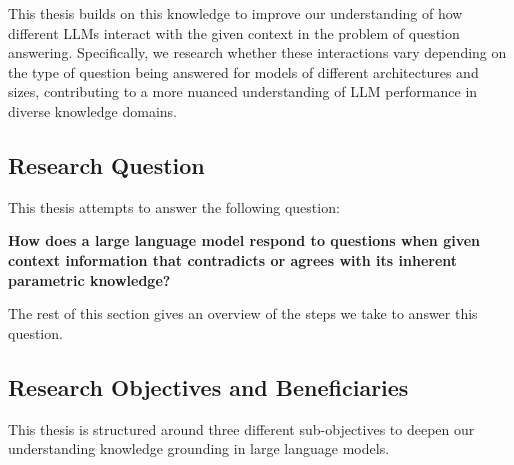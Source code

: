 This thesis builds on this knowledge to improve our understanding of how different LLMs interact with the given context in the problem of question answering.
Specifically, we research whether these interactions vary depending on the type of question being answered for models of different architectures and sizes, contributing to a more nuanced understanding of LLM performance in diverse knowledge domains.

\newpage{}

\subsection{Research Question}
\label{research_question}

This thesis attempts to answer the following question:

\textbf{How does a large language model respond to questions when given context information that contradicts  or agrees with its inherent parametric knowledge?}

The rest of this section gives an overview of the steps we take to answer this question.

\subsection{Research Objectives and Beneficiaries}
\label{introduction_research_objectives}

This thesis is structured around three different sub-objectives to deepen our understanding knowledge grounding in large language models.


